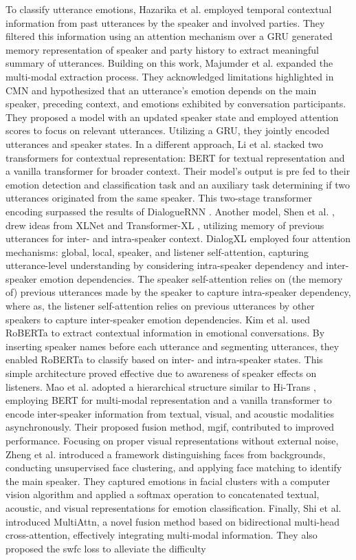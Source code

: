     To classify utterance emotions, Hazarika et al. \cite{cmn} employed temporal contextual information from past utterances by the speaker and involved parties. They filtered this information using an attention mechanism over a GRU generated memory representation of speaker and party history to extract meaningful summary of utterances. Building on this work, Majumder et al. \cite{dialoguernn} expanded the multi-modal extraction process. They acknowledged limitations highlighted in CMN \cite{cmn} and hypothesized that an utterance's emotion depends on the main speaker, preceding context, and emotions exhibited by conversation participants. They proposed a model with an updated speaker state and employed attention scores to focus on relevant utterances. Utilizing a GRU, they jointly encoded utterances and speaker states. In a different approach, Li et al. \cite{hitrans} stacked two transformers for contextual representation: BERT for textual representation and a vanilla transformer for broader context. Their model's output is pre fed to their emotion detection and classification task and an auxiliary task determining if two utterances originated from the same speaker. This two-stage transformer encoding surpassed the results of DialogueRNN \cite{dialoguernn}. Another model, Shen et al. \cite{dialogxl}, drew ideas from XLNet \cite{xlnet} and Transformer-XL \cite{txl}, utilizing memory of previous utterances for inter- and intra-speaker context. DialogXL employed four attention mechanisms: global, local, speaker, and listener self-attention, capturing utterance-level understanding by considering intra-speaker dependency and inter-speaker emotion dependencies. The speaker self-attention relies on (the memory of) previous utterances made by the speaker to capture intra-speaker dependency, where as, the listener self-attention relies on previous utterances by other speakers to capture inter-speaker emotion dependencies. Kim et al. \cite{emoberta} used RoBERTa to extract contextual information in emotional conversations. By inserting speaker names before each utterance and segmenting utterances, they enabled RoBERTa to classify based on inter- and intra-speaker states. This simple architecture proved effective due to awareness of speaker effects on listeners. Mao et al. \cite{dialoguetrm} adopted a hierarchical structure similar to Hi-Trans \cite{hitrans}, employing BERT for multi-modal representation and a vanilla transformer to encode inter-speaker information from textual, visual, and acoustic modalities asynchronously. Their proposed fusion method, \ac{mgif}, contributed to improved performance. Focusing on proper visual representations without external noise, Zheng et al. \cite{fmmt} introduced a framework distinguishing faces from backgrounds, conducting unsupervised face clustering, and applying face matching to identify the main speaker. They captured emotions in facial clusters with a computer vision algorithm and applied a softmax operation to concatenated textual, acoustic, and visual representations for emotion classification. Finally, Shi et al. \cite{multiemo} introduced MultiAttn, a novel fusion method based on bidirectional multi-head cross-attention, effectively integrating multi-modal information. They also proposed the \ac{swfc} loss to alleviate the difficulty 